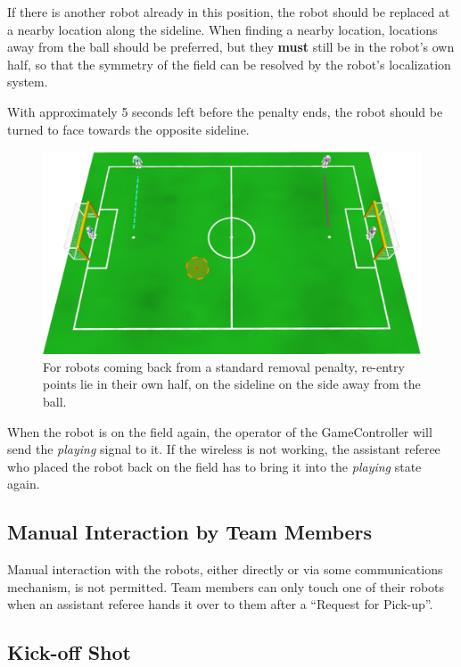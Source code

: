 \documentclass[12pt]{article}
\begin{document}
If there is another robot already in this position, the robot should be replaced at a nearby location along the sideline. When finding a nearby location, locations away from the ball should be preferred, but they \textbf{must} still be in the robot's own half, so that the symmetry of the field can be resolved by the robot's localization system.

With approximately 5 seconds left before the penalty ends, the robot should be turned to face towards the opposite sideline.

\begin{figure}[t]
\centerline{\includegraphics[width=\columnwidth]{figs/penalty_re-entry_points.pdf}}
\caption{For robots coming back from a standard removal penalty, re-entry points lie in their own half, on the sideline on the side away from the ball.}
\label{fig:penalty_re-entry_points}
\end{figure}

When the robot is on the field again, the operator of the GameController will send the \emph{playing} signal to it. If the wireless is not working, the assistant referee who placed the robot back on the field has to bring it into the \emph{playing} state again.

\subsection{Manual Interaction by Team Members}

Manual interaction with the robots, either directly or via some communications mechanism, is not permitted. Team members can only touch one of their robots when an assistant referee hands it over to them after a ``Request for Pick-up''.

\subsection{Kick-off Shot}
\label{sec:kick-off_shot}
\end{document}
